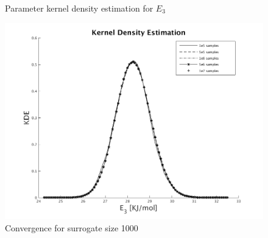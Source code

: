   \begin{figure}[H]
  \ContinuedFloat
  \centering
{}
\caption{ Parameter  kernel density estimation for $E_3$}
\end{figure}


\begin{figure}[H]
\includegraphics[scale = 0.5]{model_1/sample_conv}
    \caption{Convergence for surrogate size 1000}
    \label{fig-2:conv_sample}
\end{figure}



